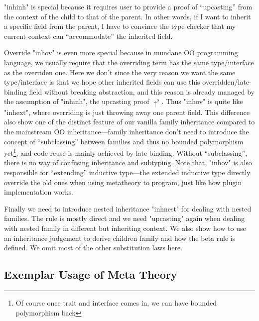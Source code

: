 "inhinh" is special because it requires user to provide a proof of
``upcasting'' from the context of the child to that of the parent.
In other words, if I want to inherit a specific field from the parent, I
have to convince the type checker that my current context can
``accommodate'' the inherited field. 

Override "inhov" is even more special because in mundane OO programming language, we usually require that the overriding term has the same type/interface as the overriden one.  Here we don't since the very reason we want the same type/interface is that we hope other inherited fields can use this overridden/late-binding field without breaking abstraction, and this reason is already managed by the assumption of "inhinh", the upcasting proof $\uparrow^s$. Thus "inhov" is quite like "inhext", where overriding is just throwing away one parent field. This difference also show one of the distinct feature of our vanilla family inheritance compared to the mainstream OO inheritance---family inheritance don't need to introduce the concept of ``subclassing'' between families and thus no bounded polymorphism yet\footnote{Of course once trait and interface comes in, we can have bounded polymorphism back}, and code reuse is mainly achieved by late binding. Without ``subclassing'', there is no way of confusing inheritance and subtyping. Note that, "inhov" is also responsible for ``extending'' inductive type---the extended inductive type directly override the old ones when using metatheory to program, just like how plugin implementation works.

Finally we need to introduce nested inheritance "inhnest" for dealing with nested families. The rule is mostly direct and we need "upcasting" again when dealing with nested family in different but inheriting context.  We also show how to use an inheritance judgement to derive children family and how the beta rule is defined. We omit most of the other substitution laws here.



\subsection{Exemplar Usage of Meta Theory}
